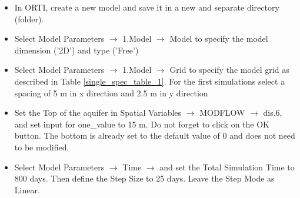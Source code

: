 \begin{itemize}

\item In ORTI, create a new model and save it in a new and separate directory (folder).

\item Select {\color{blue}Model Parameters} $\rightarrow$ {\color{blue}1.Model} 
$\rightarrow$ {\color{blue}Model} to specify the model dimension {\color{blue}('2D')} and type {\color{blue}('Free')}

\item Select {\color{blue}Model Parameters} $\rightarrow$ {\color{blue}1.Model} 
$\rightarrow$ {\color{blue}Grid} to specify
the model grid as described in Table \ref{single_spec_table_1}. For the first simulations 
select a spacing of 5 m in x direction and 2.5 m in y direction

\item Set the Top of the aquifer in {\color{blue}Spatial Variables} $\rightarrow$ {\color{blue}MODFLOW} 
$\rightarrow$ {\color{blue}dis.6}, and set input for {\color{blue}one\_value} to 15 m. 
Do not forget to click on the {\color{blue}OK} button. 
The bottom is already set to the default value of 0 and does not need to be modified.


\item Select {\color{blue}Model Parameters} $\rightarrow$ {\color{blue}Time} $\rightarrow$ 
and set the  {\color{blue} Total Simulation Time} to 800 days. 
Then define the {\color{blue}Step Size} to 25 days. Leave the {\color{blue}Step Mode} as Linear. 



\end{itemize}
